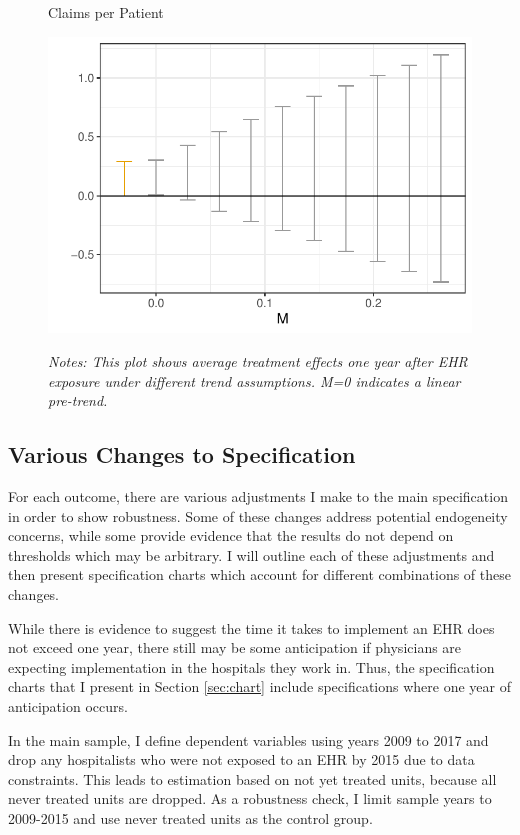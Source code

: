 \documentclass[12pt]{article}
\begin{document}
\begin{figure}[ht]
    \centering
    \captionsetup{width=.5\linewidth}
    \caption{Claims per Patient}
    \includegraphics[scale=.5]{Objects/claim_pretrends_plot.pdf}
    \label{fig:pre_claim}
    \vspace{2mm}
    \caption*{\footnotesize{\textit{Notes: This plot shows average treatment effects one year after EHR exposure under different trend assumptions. M=0 indicates a linear pre-trend.}}}
\end{figure}

\subsection{Various Changes to Specification}\label{sec:changes}

For each outcome, there are various adjustments I make to the main specification in order to show robustness. Some of these changes address potential endogeneity concerns, while some provide evidence that the results do not depend on thresholds which may be arbitrary. I will outline each of these adjustments and then present specification charts which account for different combinations of these changes. 

While there is evidence to suggest the time it takes to implement an EHR does not exceed one year, there still may be some anticipation if physicians are expecting implementation in the hospitals they work in. Thus, the specification charts that I present in Section \ref{sec:chart} include specifications where one year of anticipation occurs. 

In the main sample, I define dependent variables using years 2009 to 2017 and drop any hospitalists who were not exposed to an EHR by 2015 due to data constraints. This leads to estimation based on not yet treated units, because all never treated units are dropped. As a robustness check, I limit sample years to 2009-2015 and use never treated units as the control group. 
\end{document}
